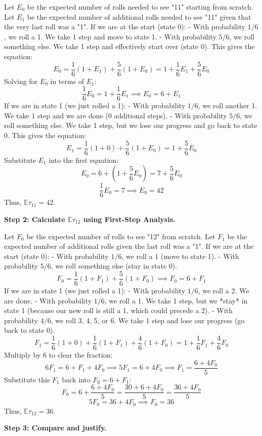 \begin{solution}
Let $E_0$ be the expected number of rolls needed to see "11" starting from scratch.
Let $E_1$ be the expected number of additional rolls needed to see "11" given that the very last roll was a "1".
If we are at the start (state 0):
- With probability $1/6$, we roll a 1. We take 1 step and move to state 1.
- With probability $5/6$, we roll something else. We take 1 step and effectively start over (state 0).
This gives the equation:
\[ E_0 = \frac{1}{6}(1 + E_1) + \frac{5}{6}(1 + E_0) = 1 + \frac{1}{6}E_1 + \frac{5}{6}E_0 \]
Solving for $E_0$ in terms of $E_1$:
\[ \frac{1}{6}E_0 = 1 + \frac{1}{6}E_1 \implies E_0 = 6 + E_1 \]
If we are in state 1 (we just rolled a 1):
- With probability $1/6$, we roll another 1. We take 1 step and we are done (0 additional steps).
- With probability $5/6$, we roll something else. We take 1 step, but we lose our progress and go back to state 0.
This gives the equation:
\[ E_1 = \frac{1}{6}(1 + 0) + \frac{5}{6}(1 + E_0) = 1 + \frac{5}{6}E_0 \]
Substitute $E_1$ into the first equation:
\[ E_0 = 6 + \left(1 + \frac{5}{6}E_0\right) = 7 + \frac{5}{6}E_0 \]
\[ \frac{1}{6}E_0 = 7 \implies E_0 = 42 \]
Thus, $\mathbb{E}\tau_{11} = 42$.

\textbf{Step 2: Calculate $\mathbb{E}\tau_{12}$ using First-Step Analysis.}

Let $F_0$ be the expected number of rolls to see "12" from scratch.
Let $F_1$ be the expected number of additional rolls given the last roll was a "1".
If we are at the start (state 0):
- With probability $1/6$, we roll a 1 (move to state 1).
- With probability $5/6$, we roll something else (stay in state 0).
\[ F_0 = \frac{1}{6}(1 + F_1) + \frac{5}{6}(1 + F_0) \implies F_0 = 6 + F_1 \]
If we are in state 1 (we just rolled a 1):
- With probability $1/6$, we roll a 2. We are done.
- With probability $1/6$, we roll a 1. We take 1 step, but we *stay* in state 1 (because our new roll is still a 1, which could precede a 2).
- With probability $4/6$, we roll 3, 4, 5, or 6. We take 1 step and lose our progress (go back to state 0).
\[ F_1 = \frac{1}{6}(1 + 0) + \frac{1}{6}(1 + F_1) + \frac{4}{6}(1 + F_0) = 1 + \frac{1}{6}F_1 + \frac{4}{6}F_0 \]
Multiply by 6 to clear the fraction:
\[ 6F_1 = 6 + F_1 + 4F_0 \implies 5F_1 = 6 + 4F_0 \implies F_1 = \frac{6 + 4F_0}{5} \]
Substitute this $F_1$ back into $F_0 = 6 + F_1$:
\[ F_0 = 6 + \frac{6 + 4F_0}{5} = \frac{30 + 6 + 4F_0}{5} = \frac{36 + 4F_0}{5} \]
\[ 5F_0 = 36 + 4F_0 \implies F_0 = 36 \]
Thus, $\mathbb{E}\tau_{12} = 36$.

\textbf{Step 3: Compare and justify.}


\end{solution}
